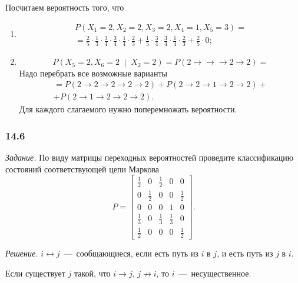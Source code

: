 Посчитаем вероятность того, что
\begin{enumerate}[label=\alph*)]
  \item \begin{gather*}
    P \left( X_1 = 2, X_2 = 2, X_3 = 2, X_4 = 1, X_5 = 3 \right) = \\
    = \frac{2}{5} \cdot \frac{1}{3} \cdot \frac{3}{4} \cdot \frac{3}{4} \cdot \frac{1}{4} \cdot
    \frac{2}{3} +
    \frac{1}{5} \cdot \frac{3}{4} \cdot \frac{3}{4} \cdot \frac{1}{4} \cdot \frac{2}{3} +
    \frac{2}{5} \cdot 0;
  \end{gather*}
  \item \begin{equation*}
    P \left( X_5 = 2, X_6 = 2 \; \middle| \; X_2 = 2 \right) =
    P \left( 2 \to \to \to 2 \to 2 \right) =
  \end{equation*}
  Надо перебрать все возможные варианты
  \begin{gather*}
    = P \left( 2 \to 2 \to 2 \to 2 \to 2 \right) + P \left( 2 \to 2 \to 1 \to 2 \to 2 \right) + \\
    + P \left( 2 \to 1 \to 2 \to 2 \to 2 \right).
  \end{gather*}
  Для каждого слагаемого нужно поперемножать вероятности.
\end{enumerate}

\subsubsection*{14.6}

\textit{Задание.}
По виду матрицы переходных вероятностей проведите классификацию состояний соответствующей цепи
Маркова
\begin{equation*}
  P =
  \begin{bmatrix}
    \frac{1}{2} & 0 & \frac{1}{2} & 0 & 0 \\
    0 & \frac{1}{2} & 0 & 0 & \frac{1}{2} \\
    0 & 0 & 0 & 1 & 0 \\
    \frac{1}{3} & 0 & \frac{1}{3} & \frac{1}{3} & 0 \\
    \frac{1}{2} & 0 & 0 & 0 & \frac{1}{2}
  \end{bmatrix}.
\end{equation*}

\textit{Решение.}
$i \leftrightarrow j$~---~сообщающиеся, если есть путь из $i$ в $j$, и есть путь из $j$ в $i$.

Если существует $j$ такой, что $i \to j, \, j \not \to i$, то $i$~---~несущественное.

